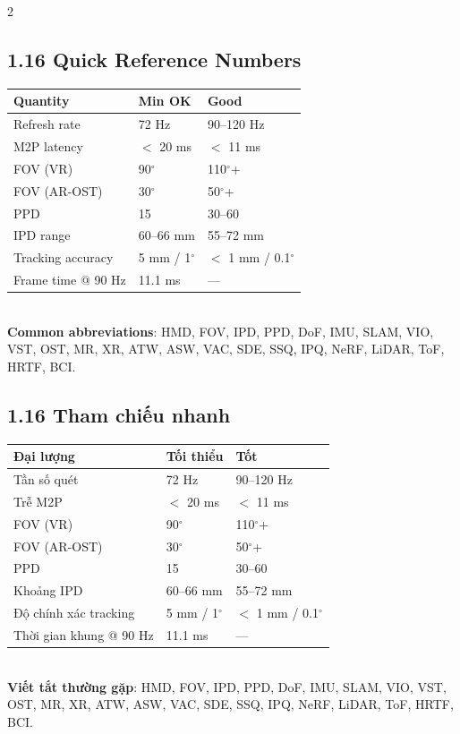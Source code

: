 \begin{paracol}{2}
\subsection*{1.16 Quick Reference Numbers}
{\scriptsize
\begin{tabular}{@{}lll@{}}
\toprule
\textbf{Quantity} & \textbf{Min OK} & \textbf{Good} \\
\midrule
Refresh rate & 72 Hz & 90–120 Hz \\
M2P latency & $<$ 20 ms & $<$ 11 ms \\
FOV (VR) & 90$^\circ$ & 110$^\circ$+ \\
FOV (AR-OST) & 30$^\circ$ & 50$^\circ$+ \\
PPD & 15 & 30–60 \\
IPD range & 60–66 mm & 55–72 mm \\
Tracking accuracy & 5 mm / 1$^\circ$ & $<$ 1 mm / 0.1$^\circ$ \\
Frame time @ 90 Hz & 11.1 ms & — \\
\bottomrule
\end{tabular}\\[2pt]
\textbf{Common abbreviations}: HMD, FOV, IPD, PPD, DoF, IMU, SLAM, VIO, VST, OST, MR, XR, ATW, ASW, VAC, SDE, SSQ, IPQ, NeRF, LiDAR, ToF, HRTF, BCI.}

\switchcolumn

\subsection*{1.16 Tham chiếu nhanh}
{\scriptsize
\begin{tabular}{@{}lll@{}}
\toprule
\textbf{Đại lượng} & \textbf{Tối thiểu} & \textbf{Tốt} \\
\midrule
Tần số quét & 72 Hz & 90–120 Hz \\
Trễ M2P & $<$ 20 ms & $<$ 11 ms \\
FOV (VR) & 90$^\circ$ & 110$^\circ$+ \\
FOV (AR-OST) & 30$^\circ$ & 50$^\circ$+ \\
PPD & 15 & 30–60 \\
Khoảng IPD & 60–66 mm & 55–72 mm \\
Độ chính xác tracking & 5 mm / 1$^\circ$ & $<$ 1 mm / 0.1$^\circ$ \\
Thời gian khung @ 90 Hz & 11.1 ms & — \\
\bottomrule
\end{tabular}\\[2pt]
\textbf{Viết tắt thường gặp}: HMD, FOV, IPD, PPD, DoF, IMU, SLAM, VIO, VST, OST, MR, XR, ATW, ASW, VAC, SDE, SSQ, IPQ, NeRF, LiDAR, ToF, HRTF, BCI.}

\end{paracol}
